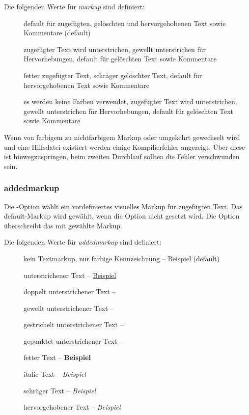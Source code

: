 Die folgenden Werte für \emph{markup} sind definiert:
\begin{description}
	\item [] default für zugefügten, gelöschten und hervorgehobenen Text sowie Kommentare (default)
	\item [] zugefügter Text wird unterstrichen, gewellt unterstrichen für Hervorhebungen, default für gelöschten Text sowie Kommentare
	\item [] fetter zugefügter Text, schräger gelöschter Text, default für hervorgehobenen Text sowie Kommentare
	\item [] es werden keine Farben verwendet, zugefügter Text wird unterstrichen, gewellt unterstrichen für Hervorhebungen, default für gelöschten Text sowie Kommentare
\end{description}


Wenn von farbigem zu nichtfarbigem Markup oder umgekehrt gewechselt wird und eine Hilfsdatei existiert werden einige Kompilierfehler angezeigt.
Über diese ist hinwegzuspringen, beim zweiten Durchlauf sollten die Fehler verschwunden sein.


\subsubsection{addedmarkup}


Die -Option wählt ein vordefiniertes visuelles Markup für zugefügten Text.
Das default-Markup wird gewählt, wenn die Option nicht gesetzt wird.
Die Option  überschreibt das mit  gewählte Markup.

Die folgenden Werte für \emph{addedmarkup} sind definiert:
\begin{description}
	\item [] kein Textmarkup, nur farbige Kennzeichnung -- {\color{orange} Beispiel} (default)
	\item [] unterstrichener Text -- \uline{Beispiel}
	\item [] doppelt unterstrichener Text -- 
	\item [] gewellt unterstrichener Text -- 
	\item [] gestrichelt unterstrichener Text -- 
	\item [] gepunktet unterstrichener Text -- 
	\item [] fetter Text -- \textbf{Beispiel}
	\item [] italic Text -- \textit{Beispiel}
	\item [] schräger Text -- \textsl{Beispiel}
	\item [] hervorgehobener Text -- \emph{Beispiel}
\end{description}

